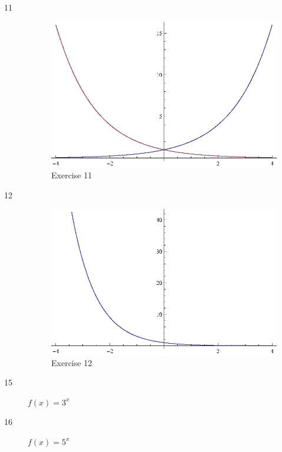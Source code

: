\documentclass{exam}
\begin{document}
    \begin{description}

      \item[11] 
        \begin{figure}[H]
          \centering
          \includegraphics[scale=0.9]{exercise11.eps}
          \caption*{Exercise 11}
        \end{figure}

      \item[12] 
        \begin{figure}[H]
          \centering
          \includegraphics[scale=0.9]{exercise12.eps}
          \caption*{Exercise 12}
        \end{figure}

      \item[15] $f(x) = 3^x$

      \item[16] $f(x) = 5^x$


\end{description}
\end{document}
